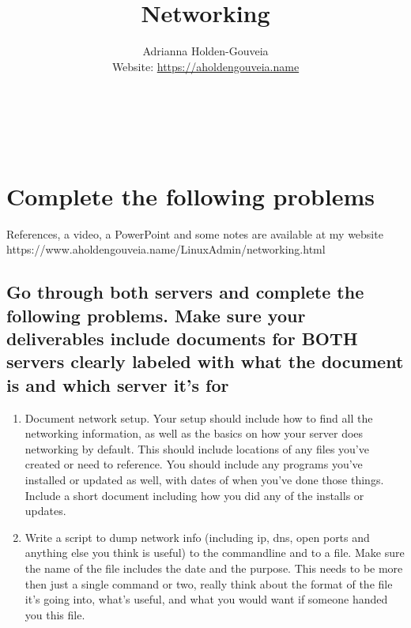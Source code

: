 \documentclass[12pt]{article}
\title{Networking}
\author{
        Adrianna Holden-Gouveia \\
        Website: \url{https://aholdengouveia.name}\\ 
        \date{\vspace{-5ex}}
        \faLinkedin{: aholdengouveia} \\
        \faGithub {: aholdengouveia} \\
        \faTwitter {: aholdengouveia} \\
        }
\begin{document}
    

\maketitle


\section*{Complete the following problems}

References, a video, a PowerPoint and some notes are available at my website
https://www.aholdengouveia.name/LinuxAdmin/networking.html



\subsection*{Go through both servers and complete the following problems.  Make sure your deliverables include documents for BOTH servers clearly labeled with what the document is and which server it's for}
    \begin{enumerate}
        \item Document network setup. Your setup should include how to find all the networking information, as well as the basics on how your server does networking by default. This should include locations of any files you've created or need to reference. You should include any programs you've installed or updated as well, with dates of when you've done those things. Include a short document including how you did any of the installs or updates. 
        \item Write a script to dump network info (including ip, dns, open ports and anything else you think is useful) to the commandline and to a file.  Make sure the name of the file includes the date and the purpose.  This needs to be more then just a single command or two, really think about the format of the file it's going into, what's useful, and what you would want if someone handed you this file. 
    \end{enumerate}
\end{document}
